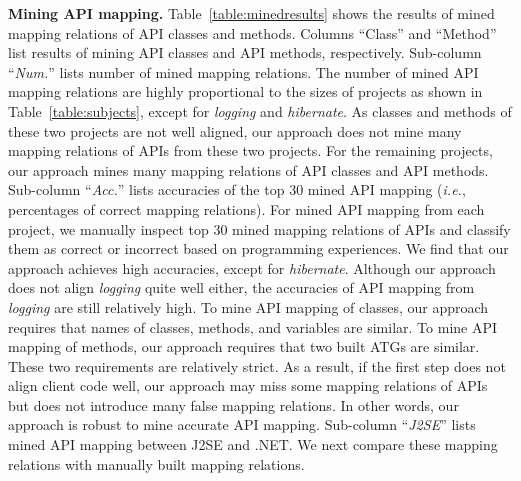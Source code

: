 \textbf{Mining API mapping.}
Table~\ref{table:minedresults} shows the results of mined mapping
relations of API classes and methods.
Columns ``Class'' and ``Method'' list results of mining API classes
and API methods, respectively. Sub-column
``\emph{Num.}'' lists number of mined mapping relations. The
number of mined API mapping relations are highly proportional to the sizes
of projects as shown in Table~\ref{table:subjects}, except for
\emph{logging} and \emph{hibernate}. As classes and methods of these
two projects are not well aligned, our approach does not mine
many mapping relations of APIs from these two projects. For the
remaining projects, our approach mines many mapping relations of API
classes and API methods. Sub-column ``\emph{Acc.}'' lists accuracies
of the top 30 mined API mapping (\emph{i.e.}, percentages of correct
mapping relations). For mined API mapping from each project, we
manually inspect top 30 mined mapping relations of APIs and classify
them as correct or incorrect based on programming experiences. We
find that our approach achieves high accuracies, except for
\emph{hibernate}. Although our approach does not align
\emph{logging} quite well either, the accuracies of API mapping from
\emph{logging} are still relatively high. To mine API mapping of
classes, our approach requires that names of classes, methods, and
variables are similar. To mine API mapping of methods, our
approach requires that two built ATGs are
similar. These two requirements are relatively strict. As a result, if
the first step does not align client code well, our approach may
miss some mapping relations of APIs but does not introduce many
false mapping relations. In other words, our approach is robust to
mine accurate API mapping. Sub-column ``\emph{J2SE}'' lists mined
API mapping between J2SE and .NET. We next compare these mapping
relations with manually built mapping relations.

